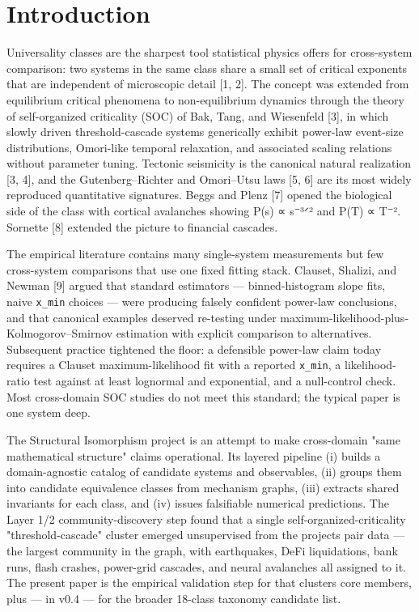 \documentclass[
  11pt]{article}
\begin{document}
\section{Introduction}\label{introduction}

Universality classes are the sharpest tool statistical physics offers
for cross-system comparison: two systems in the same class share a small
set of critical exponents that are independent of microscopic detail
{[}1, 2{]}. The concept was extended from equilibrium critical phenomena
to non-equilibrium dynamics through the theory of self-organized
criticality (SOC) of Bak, Tang, and Wiesenfeld {[}3{]}, in which slowly
driven threshold-cascade systems generically exhibit power-law
event-size distributions, Omori-like temporal relaxation, and associated
scaling relations without parameter tuning. Tectonic seismicity is the
canonical natural realization {[}3, 4{]}, and the Gutenberg--Richter and
Omori--Utsu laws {[}5, 6{]} are its most widely reproduced quantitative
signatures. Beggs and Plenz {[}7{]} opened the biological side of the
class with cortical avalanches showing P(s) ∝ s⁻³ᐟ² and P(T) ∝ T⁻².
Sornette {[}8{]} extended the picture to financial cascades.

The empirical literature contains many single-system measurements but
few cross-system comparisons that use one fixed fitting stack. Clauset,
Shalizi, and Newman {[}9{]} argued that standard estimators ---
binned-histogram slope fits, naive \texttt{x\_min} choices --- were
producing falsely confident power-law conclusions, and that canonical
examples deserved re-testing under
maximum-likelihood-plus-Kolmogorov--Smirnov estimation with explicit
comparison to alternatives. Subsequent practice tightened the floor: a
defensible power-law claim today requires a Clauset maximum-likelihood
fit with a reported \texttt{x\_min}, a likelihood-ratio test against at
least lognormal and exponential, and a null-control check. Most
cross-domain SOC studies do not meet this standard; the typical paper is
one system deep.

The Structural Isomorphism project is an attempt to make cross-domain
"same mathematical structure" claims operational. Its layered pipeline
(i) builds a domain-agnostic catalog of candidate systems and
observables, (ii) groups them into candidate equivalence classes from
mechanism graphs, (iii) extracts shared invariants for each class, and
(iv) issues falsifiable numerical predictions. The Layer 1/2
community-discovery step found that a single self-organized-criticality
"threshold-cascade" cluster emerged unsupervised from the
project\textquotesingle s pair data --- the largest community in the
graph, with earthquakes, DeFi liquidations, bank runs, flash crashes,
power-grid cascades, and neural avalanches all assigned to it. The
present paper is the empirical validation step for that
cluster\textquotesingle s core members, plus --- in v0.4 --- for the
broader 18-class taxonomy candidate list.
\end{document}
